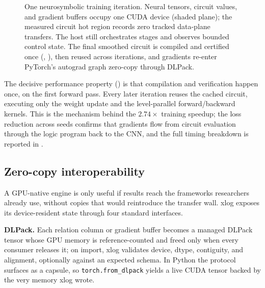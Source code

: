 \begin{figure}[tbp]
  \caption{One neurosymbolic training iteration. Neural tensors, circuit values,
  and gradient buffers occupy one CUDA device (shaded plane); the measured circuit
  hot region records zero tracked data-plane transfers. The host still orchestrates
  stages and observes bounded control state. The final smoothed circuit is compiled
  and certified once (\checkmark, ), then reused across iterations, and
  gradients re-enter PyTorch's autograd graph zero-copy through DLPack.}
  \label{fig:training}
\end{figure}

The decisive performance property () is that compilation and verification happen once, on the first forward pass. Every later iteration reuses the cached circuit, executing only the weight update and the level-parallel forward/backward kernels. This is the mechanism behind the $2.74\times$ training speedup; the loss reduction across seeds confirms that gradients flow from circuit evaluation through the logic program back to the CNN, and the full timing breakdown is reported in .

\subsection{Zero-copy interoperability}\label{subsec:interop}

A GPU-native engine is only useful if results reach the frameworks researchers already use, without copies that would reintroduce the transfer wall. xlog exposes its device-resident state through four standard interfaces.

\textbf{DLPack.} Each relation column or gradient buffer becomes a managed DLPack~\cite{dlpack} tensor whose GPU memory is reference-counted and freed only when every consumer releases it; on import, xlog validates device, dtype, contiguity, and alignment, optionally against an expected schema. In Python the protocol surfaces as a capsule, so \texttt{torch.from\_dlpack} yields a live CUDA tensor backed by the very memory xlog wrote.

